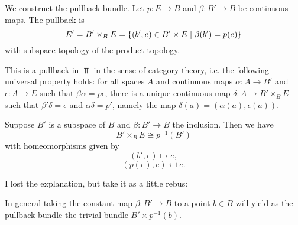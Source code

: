 
We construct the pullback bundle. Let $p:E\to B$ and $\beta:B'\to B$ be continuous maps. The pullback is \[E'=B'\times_B E=\{(b',e)\in B'\times E\mid \beta(b')=p(e)\}\]
with subspace topology of the product topology.

\begin{center}
\end{center}

This is a pullback in $\Top$ in the sense of category theory, i.e. the following universal property holds: for all spaces $A$ and continuous maps $\alpha:A\to B'$ and $\epsilon:A\to E$ such that $\beta\alpha=p\epsilon$, there is a unique continuous map $\delta:A\to B'\times_B E$ such that $\beta'\delta=\epsilon$ and $\alpha\delta=p'$, namely the map $\delta(a)=(\alpha(a),\epsilon(a))$.
\begin{center}
\end{center}

\begin{example}
Suppose $B'$ is a subspace of $B$ and $\beta:B'\to B$ the inclusion. Then we have
\[B'\times_B E\cong p^{-1}(B')\]
with homeomorphisms given by
\[(b',e)\mapsto e,\]
\[(p(e),e)\mapsfrom e.\]
\end{example}

\begin{example}
I lost the explanation, but take it as a little rebus:
\begin{center}
\end{center}
\end{example}
In general taking the constant map $\beta:B'\to B$ to a point $b\in B$ will yield as the pullback bundle the trivial bundle $B'\times p^{-1}(b)$.

